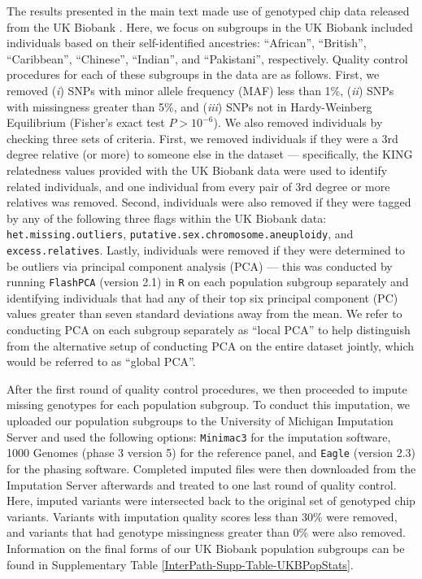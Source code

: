 \documentclass[10pt]{article}
\begin{document}
The results presented in the main text made use of genotyped chip data released from the UK Biobank \cite{Sudlow2015}. Here, we focus on subgroups in the UK Biobank included individuals based on their self-identified ancestries: ``African'', ``British'', ``Caribbean'', ``Chinese'', ``Indian'', and ``Pakistani'', respectively. Quality control procedures for each of these subgroups in the data are as follows. First, we removed (\textit{i}) SNPs with minor allele frequency (MAF) less than 1\%, (\textit{ii}) SNPs with missingness greater than 5\%, and (\textit{iii}) SNPs not in Hardy-Weinberg Equilibrium (Fisher's exact test $P > 10^{-6}$). We also removed individuals by checking three sets of criteria. First, we removed individuals if they were a 3rd degree relative (or more) to someone else in the dataset --- specifically, the KING relatedness values provided with the UK Biobank data were used to identify related individuals, and one individual from every pair of 3rd degree or more relatives was removed. Second, individuals were also removed if they were tagged by any of the following three flags within the UK Biobank data: \texttt{het.missing.outliers}, \texttt{putative.sex.chromosome.aneuploidy}, and \texttt{excess.relatives}. Lastly, individuals were removed if they were determined to be outliers via principal component analysis (PCA) --- this was conducted by running \texttt{FlashPCA} (version 2.1) \cite{Abraham2017} in \texttt{R} on each population subgroup separately and identifying individuals that had any of their top six principal component (PC) values greater than seven standard deviations away from the mean. We refer to conducting PCA on each subgroup separately as ``local PCA'' to help distinguish from the alternative setup of conducting PCA on the entire dataset jointly, which would be referred to as ``global PCA''. 

After the first round of quality control procedures, we then proceeded to impute missing genotypes for each population subgroup. To conduct this imputation, we uploaded our population subgroups to the University of Michigan Imputation Server \cite{Das2016} and used the following options: \texttt{Minimac3} for the imputation software, 1000 Genomes (phase 3 version 5) for the reference panel, and \texttt{Eagle} (version 2.3) for the phasing software. Completed imputed files were then downloaded from the Imputation Server afterwards and treated to one last round of quality control. Here, imputed variants were intersected back to the original set of genotyped chip variants. Variants with imputation quality scores  less than 30\% were removed, and variants that had genotype missingness greater than 0\% were also removed. Information on the final forms of our UK Biobank population subgroups can be found in Supplementary Table \ref{InterPath-Supp-Table-UKBPopStats}.
\end{document}
